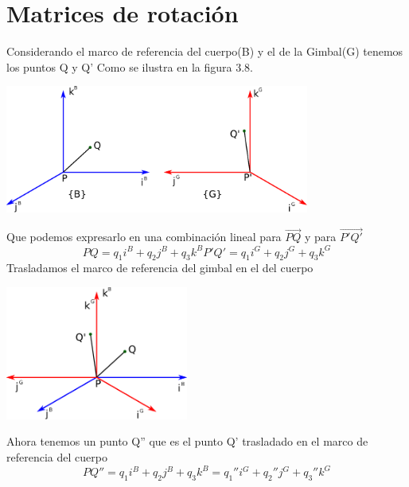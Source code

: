 \section{Matrices de rotación}
Considerando el marco de referencia del cuerpo(B) y el de la Gimbal(G) tenemos los puntos Q y Q'
Como se ilustra en la figura 3.8.
\begin{center}
	\includegraphics[width=0.75\textwidth]{Contenido/Cuerpo/Capitulo3/Fig13.eps}
	\label{fig:ModeloMat:Fig1}
\end{center}
Que podemos expresarlo en una combinación lineal para $\overrightarrow{PQ}$ y para $\overrightarrow{P'Q'}$
\begin{subequations}
	\begin{equation}
		PQ = q_1i^B + q_2j^B + q_3k^B
	\end{equation}
	\begin{equation}
		P'Q' = q_1i^G + q_2j^G + q_3k^G
	\end{equation}
\end{subequations}
Trasladamos el marco de referencia del gimbal en el del cuerpo
\begin{center}
	\includegraphics[width=0.45\textwidth]{Contenido/Cuerpo/Capitulo3/Fig14.eps}
	\label{fig:ModeloMat:Fig1}
\end{center}
Ahora tenemos un punto Q'' que es el punto Q' trasladado en el marco de referencia del cuerpo
\begin{equation}
	PQ'' = q_1i^B + q_2j^B + q_3k^B = q_1''i^G + q_2''j^G + q_3''k^G
\end{equation}
